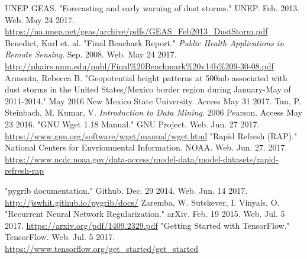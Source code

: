 \documentclass{article}
\begin{document}
\begin{thebibliography}{4}
			UNEP GEAS. "Forecasting and early warning of dust storms." UNEP. Feb. 2013. Web. May 24 2017. 
			\url{https://na.unep.net/geas/archive/pdfs/GEAS_Feb2013_DustStorm.pdf} 
			Benedict, Karl et. al. "Final Benchark Report." \textit{Public Health Applications in Remote Sensing}. Sep. 2008. Web. May 24 2017. \url{http://phairs.unm.edu/publ/Final%20Benchmark%20v14b%209-30-08.pdf}
		 Armenta, Rebecca B. "Geopotential height patterns at 500mb associated with dust storms in the United States/Mexico border region during January-May of 2011-2014." May 2016 New Mexico State University.  Access May 31 2017.
			Tan, P. Steinbach, M. Kumar, V. \textit{Introduction to Data Mining}. 2006 Pearson. Access May 23 2016. 
		 "GNU Wget 1.18 Manual." GNU Project. Web. Jun. 27 2017. \url{https://www.gnu.org/software/wget/manual/wget.html}
		"Rapid Refresh (RAP)." National Centers for Envrionmental Information. NOAA. Web. Jun. 27. 2017. \url{https://www.ncdc.noaa.gov/data-access/model-data/model-datasets/rapid-refresh-rap}

		 "pygrib documentation." Github. Dec. 29 2014. Web. Jun. 14 2017. \url{http://jswhit.github.io/pygrib/docs/}
		 Zaremba, W. Sutskever, I. Vinyals, O. "Recurrent Neural Network Regularization." arXiv. Feb. 19 2015. Web. Jul. 5 2017. \url{https://arxiv.org/pdf/1409.2329.pdf}
		 "Getting Started with TensorFlow." TensorFlow. Web. Jul. 5 2017. \url{https://www.tensorflow.org/get_started/get_started}


\end{thebibliography}
\end{document}
